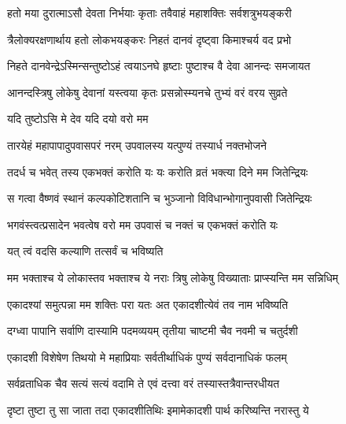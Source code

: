 \twolineshloka
{हतो मया दुरात्माऽसौ देवता निर्भयाः कृताः}
{तवैवाहं महाशक्तिः सर्वशत्रुभयङ्करी} %

\twolineshloka
{त्रैलोक्यरक्षणार्थाय हतो लोकभयङ्करः}
{निहतं दानवं दृष्ट्वा किमाश्चर्य वद प्रभो} %


\twolineshloka
{निहते दानवेन्द्रेऽस्मिन्सन्तुष्टोऽहं त्वयाऽनघे}
{हृष्टाः पुष्टाश्च वै देवा आनन्दः समजायत} %

\twolineshloka
{आनन्दस्त्रिषु लोकेषु देवानां यस्त्वया कृतः}
{प्रसन्नोस्म्यनचे तुभ्यं वरं वरय सुव्रते} %



\onelineshloka
{यदि तुष्टोऽसि मे देव यदि दयो वरो मम} %

\twolineshloka
{तारयेहं महापापादुपवासपरं नरम्}
{उपवालस्य यत्पुण्यं तस्यार्ध नक्तभोजने} %

\twolineshloka
{तदर्ध च भवेत् तस्य एकभक्तं करोति यः}
{यः करोति व्रतं भक्त्या दिने मम जितेन्द्रियः} %

\twolineshloka
{स गत्वा वैष्णवं स्थानं कल्पकोटिशतानि च}
{भुञ्जानो विविधान्भोगानुपवासी जितेन्द्रियः} %

\twolineshloka
{भगवंस्त्वत्प्रसादेन भवत्वेष वरो मम}
{उपवासं च नक्तं च एकभक्तं करोति यः} %



\onelineshloka
{यत् त्वं वदसि कल्याणि तत्सर्वं च भविष्यति} %

\twolineshloka
{मम भक्ताश्च ये लोकास्तव भक्ताश्च ये नराः}
{त्रिषु लोकेषु विख्याताः प्राप्स्यन्ति मम सन्निधिम्} %

\twolineshloka
{एकादश्यां समुत्पन्ना मम शक्तिः परा यतः}
{अत एकादशीत्येवं तव नाम भविष्यति} %

\twolineshloka
{दग्ध्वा पापानि सर्वाणि दास्यामि पदमव्ययम्}
{तृतीया चाष्टमी चैव नवमी च चतुर्दशी} %

\twolineshloka
{एकादशी विशेषेण तिथयो मे महाप्रियाः}
{सर्वतीर्थाधिकं पुण्यं सर्वदानाधिकं फलम्} %

\twolineshloka
{सर्वव्रताधिक चैव सत्यं सत्यं वदामि ते}
{एवं दत्त्वा वरं तस्यास्तत्रैवान्तरधीयत} %

\twolineshloka
{दृष्टा तुष्टा तु सा जाता तदा एकादशीतिथिः}
{इमामेकादशी पार्थ करिष्यन्ति नरास्तु ये} %


